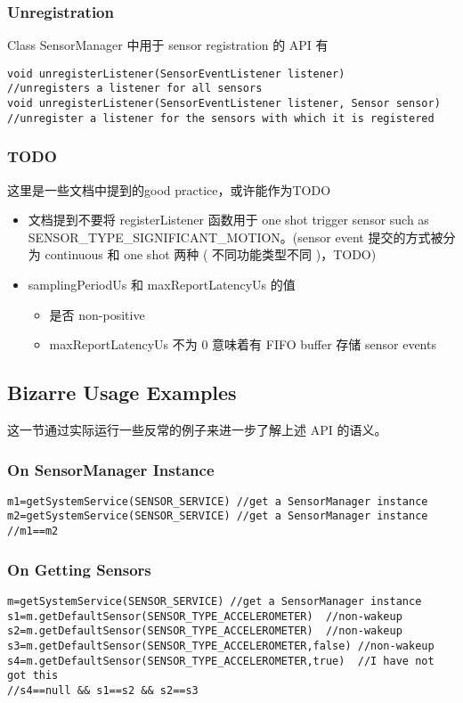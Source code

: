 {\subsubsection{Unregistration}
Class SensorManager 中用于 sensor registration 的 API 有
\begin{lstlisting}
void unregisterListener(SensorEventListener listener)
//unregisters a listener for all sensors
void unregisterListener(SensorEventListener listener, Sensor sensor)
//unregister a listener for the sensors with which it is registered
\end{lstlisting}

\subsubsection{TODO}
这里是一些文档中提到的good practice，或许能作为TODO
\begin{itemize}
  \item 文档提到不要将 registerListener 函数用于 one shot trigger sensor such as
SENSOR\_TYPE\_SIGNIFICANT\_MOTION。(sensor event 提交的方式被分为 continuous 和
one shot 两种 ( 不同功能类型不同 )，TODO)
  \item samplingPeriodUs 和 maxReportLatencyUs 的值
    \begin{itemize}
      \item 是否 non-positive
      \item maxReportLatencyUs 不为 0 意味着有 FIFO buffer 存储 sensor events
    \end{itemize}
\end{itemize}

\subsection{Bizarre Usage Examples}
这一节通过实际运行一些反常的例子来进一步了解上述 API 的语义。
\subsubsection{On SensorManager Instance}
\begin{lstlisting}
m1=getSystemService(SENSOR_SERVICE) //get a SensorManager instance
m2=getSystemService(SENSOR_SERVICE) //get a SensorManager instance
//m1==m2
\end{lstlisting}

\subsubsection{On Getting Sensors}
\begin{lstlisting}
m=getSystemService(SENSOR_SERVICE) //get a SensorManager instance
s1=m.getDefaultSensor(SENSOR_TYPE_ACCELEROMETER)  //non-wakeup
s2=m.getDefaultSensor(SENSOR_TYPE_ACCELEROMETER)  //non-wakeup
s3=m.getDefaultSensor(SENSOR_TYPE_ACCELEROMETER,false) //non-wakeup
s4=m.getDefaultSensor(SENSOR_TYPE_ACCELEROMETER,true)  //I have not got this
//s4==null && s1==s2 && s2==s3


\end{lstlisting}}
